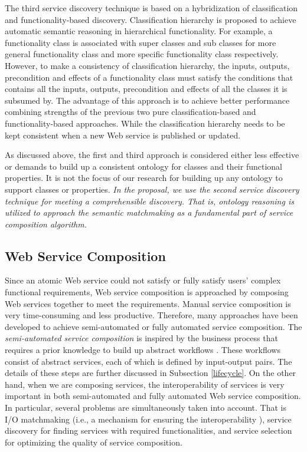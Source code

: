 The third service discovery technique is based on a hybridization of classification and functionality-based discovery. Classification hierarchy is proposed to achieve automatic semantic reasoning in hierarchical functionality. For example, a functionality class is associated with super classes and sub classes for more general functionality class and more specific functionality class respectively. However, to make a consistency of classification hierarchy, the inputs, outputs, precondition and effects of a functionality class must satisfy the conditions that contains all the inputs, outputs, precondition and effects of all the classes it is subsumed by. The advantage of this approach is to achieve better performance combining strengths of the previous two pure classification-based and functionality-based approaches. While the classification hierarchy needs to be kept consistent when a new Web service is published or updated.​

As discussed above, the first and third approach is considered either less effective or demands to build up a consistent ontology for classes and their functional properties. It is not the focus of our research for building up any ontology to support classes or properties.  \emph{In the proposal, we use the second service discovery technique for meeting a comprehensible discovery. That is, ontology reasoning is utilized to approach the semantic matchmaking as a fundamental part of service composition algorithm.}



\subsection{Web Service Composition}\label{servicecomposition}

Since an atomic Web service could not satisfy or fully satisfy users' complex functional requirements, Web service composition is approached by composing Web services together to meet the requirements. Manual service composition is very time-consuming and less productive. Therefore, many approaches have been developed to achieve semi-automated or fully automated service composition. The \emph{semi-automated service composition} is inspired by the business process that requires a prior knowledge to build up abstract workflows \cite{moghaddam2014service}. These workflows consist of abstract services, each of which is defined by input-output pairs. The details of these steps are further discussed in Subsection \ref{lifecycle}. On the other hand, when we are composing services, the interoperability of services is very important in both semi-automated and fully automated Web service composition. In particular, several problems are simultaneously taken into account. That is I/O matchmaking (i.e., a mechanism for ensuring the interoperability ), service discovery for finding services with required functionalities, and service selection for optimizing the quality of service composition. 


